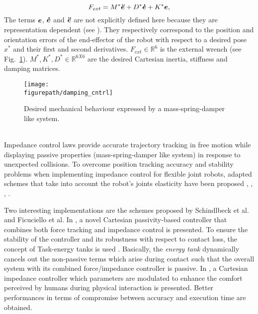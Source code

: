 \begin{itemize}
\begin{equation}
F_{ext} = M^* \mbox{\boldmath${\ddot{e}}$}+D^*\mbox{\boldmath${\dot{e}}$}+K^*\mbox{\boldmath${e}$},
\label{eq:impedance_cntrl}
\end{equation}
The terms $\mbox{\boldmath${e}$}$, $\mbox{\boldmath${\dot{e}}$}$ and $\mbox{\boldmath${\ddot{e}}$}$ are not explicitly defined here because they are representation dependent (see \cite{Siciliano2008}). They respectively correspond to the position and orientation errors of the end-effector of the robot with respect to a desired pose $x^*$ and their first and second derivatives. $F_{ext} \in \mathbb{R}^{6}$ is the external wrench (see Fig.~\ref{fig:damping_cntrl}). $M^*, K^*, D^* \in \mathbb{R}^{6X6}$ are the desired Cartesian inertia, stiffness and damping matrices. 
\vspace*{-5mm}
\begin{figure}[H]
\captionsetup{width=.86\linewidth}
\centering
\texttt{[image: \\figurepath/damping\_cntrl]}
\caption{Desired mechanical behaviour expressed by a mass-spring-damper like system.}
\label{fig:damping_cntrl}
\end{figure} \\
\vspace*{-2mm}
Impedance control laws  provide accurate trajectory tracking in free motion while displaying passive properties (mass-spring-damper like system) in response to unexpected collisions. To overcome position tracking accuracy and stability problems when implementing impedance control for flexible joint robots, adapted schemes that take into account the robot's joints elasticity have been proposed \allowbreak\cite{zollo2005compliance}, \cite{albu2007unified}, \cite{ott2008passivity}, \cite{ott2008cartesian}.   
\end{itemize}
Two interesting implementations are the schemes proposed by Schindlbeck et al. and Ficuciello et al. In \cite{schindlbeck2015unified}, a novel Cartesian passivity-based controller that combines both force tracking and impedance control is presented. To ensure the stability of the controller and its robustness with respect to contact loss, the concept of Task-energy tanks is used \cite{ferraguti2013tank}. Basically, the \textit{energy tank} dynamically cancels out the non-passive terms which arise during contact such that the overall system with its combined force/impedance controller is passive. In \cite{ficuciello2015variable}, a Cartesian impedance controller which parameters are modulated to enhance the comfort perceived by humans during physical interaction is presented. Better performances in terms of compromise between accuracy and execution time are obtained.  \\
